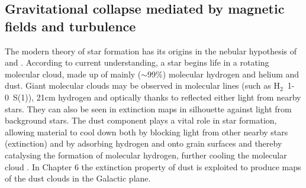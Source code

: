 \subsection{Gravitational collapse mediated by magnetic fields and turbulence}
The modern theory of star formation has its origins in the nebular hypothesis of
\citet{kant:55} and \citet{laplace:96}.
According to current understanding, a star
begins life in a rotating molecular cloud, made up of mainly ($\sim$99\%)
molecular hydrogen and helium and dust. 
Giant molecular clouds may be observed in molecular lines (such as H$_{2}$~1-0~S(1)), 
21cm hydrogen and optically thanks to reflected either light from nearby stars.
They can also be seen in extinction maps in silhouette against light from background stars.
The dust component plays a vital role in star formation, allowing material to
cool down both by blocking light from other nearby stars (extinction) and by adsorbing
hydrogen and onto grain surfaces and thereby catalysing the formation of molecular
hydrogen, further cooling the molecular cloud \citep{1979ApJS...41..555H}.
In Chapter 6 the extinction property of dust is exploited to produce maps of the
dust clouds in the Galactic plane.



